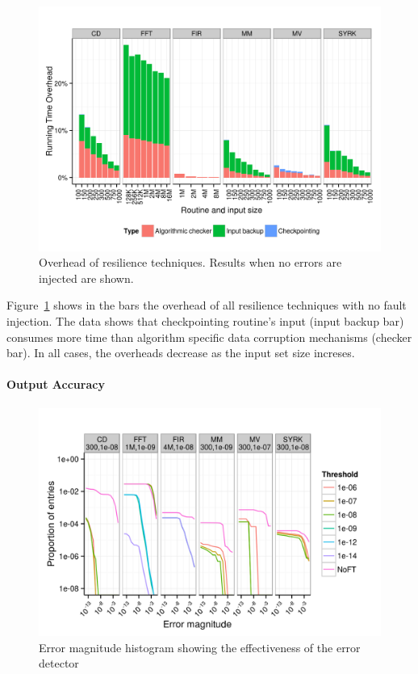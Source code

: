 \documentclass{sig-alternate}
\begin{document}
\begin{figure}[ht!]
\centering
\includegraphics[width=1.00\columnwidth]{figs/4_1_1_Overall_Breakdown.png}
\caption{Overhead of resilience techniques. Results when no errors are injected are shown.}
\label{fig:routine_all_ovhd}
\end{figure}

Figure~\ref{fig:routine_all_ovhd} shows in the bars the overhead of all resilience techniques with no fault injection.
The data shows that checkpointing routine's input (input backup bar) consumes more time than algorithm specific data corruption mechanisms (checker bar). In all cases, the overheads decrease as the input set size increses.

\paragraph{Output Accuracy}

\begin{figure}[ht!]
\centering
\includegraphics[width=1.00\columnwidth]{figs/4_1_1_Exp2_1_Example.png}
\caption{Error magnitude histogram showing the effectiveness of the error detector}
\label{fig:algo_err_dist}
\end{figure}
\end{document}
